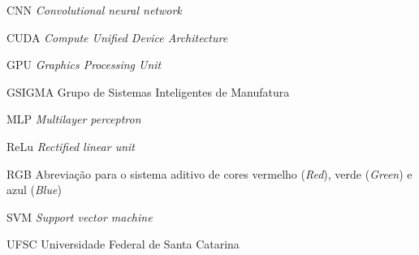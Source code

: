 
\begin{siglas}
    \item[CNN] \textit{Convolutional neural network}
    \item[CUDA] \textit{Compute Unified Device Architecture}
    \item[GPU] \textit{Graphics Processing Unit}
    \item[GSIGMA] Grupo de Sistemas Inteligentes de Manufatura
    \item[MLP] \textit{Multilayer perceptron}
    \item[ReLu] \textit{Rectified linear unit}
    \item[RGB] Abreviação para o sistema aditivo de cores vermelho (\textit{Red}), verde (\textit{Green}) e azul (\textit{Blue})
    \item[SVM] \textit{Support vector machine}
    \item[UFSC] Universidade Federal de Santa Catarina
\end{siglas}


